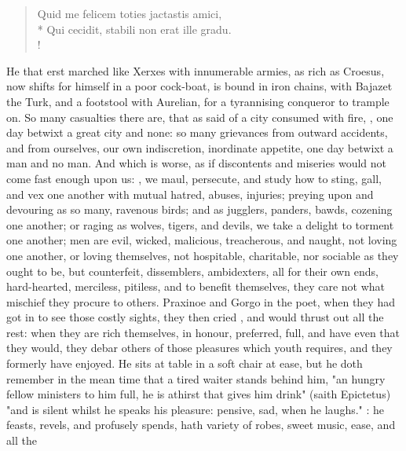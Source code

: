 \begin{latin}
\begin{verse}%
Quid me felicem toties jactastis amici,\\*
Qui cecidit, stabili non erat ille gradu.\\!
\end{verse}%
\end{latin}

He that erst marched like Xerxes with innumerable armies, as rich as Croesus,
now shifts for himself in a poor cock-boat, is bound in iron chains, with
Bajazet the Turk, and a footstool with Aurelian, for a tyrannising conqueror to
trample on. So many casualties there are, that as \Seneca{} said of a city
consumed with fire, ,
one day betwixt a great city and none: so many grievances from outward
accidents, and from ourselves, our own indiscretion, inordinate appetite, one
day betwixt a man and no man. And which is worse, as if discontents and
miseries would not come fast enough upon us: , we maul, persecute, and study how to sting, gall, and vex
one another with mutual hatred, abuses, injuries; preying upon and devouring as
so many, ravenous birds; and as jugglers, panders, bawds,
cozening one another; or raging as wolves, tigers, and
devils, we take a delight to torment one another; men are evil, wicked,
malicious, treacherous, and naught, not loving one
another, or loving themselves, not hospitable, charitable, nor sociable as they
ought to be, but counterfeit, dissemblers, ambidexters, all for their own ends,
hard-hearted, merciless, pitiless, and to benefit themselves, they care not
what mischief they procure to others. Praxinoe and Gorgo
in the poet, when they had got in to see those costly sights, they then cried
, and would thrust out all the rest: when they are rich
themselves, in honour, preferred, full, and have even that they would, they
debar others of those pleasures which youth requires, and they formerly have
enjoyed. He sits at table in a soft chair at ease, but he doth remember in the
mean time that a tired waiter stands behind him, "an hungry fellow ministers to
him full, he is athirst that gives him drink" (saith
Epictetus) "and is silent whilst he speaks his pleasure:
pensive, sad, when he laughs." : he feasts, revels,
and profusely spends, hath variety of robes, sweet music, ease, and all the
